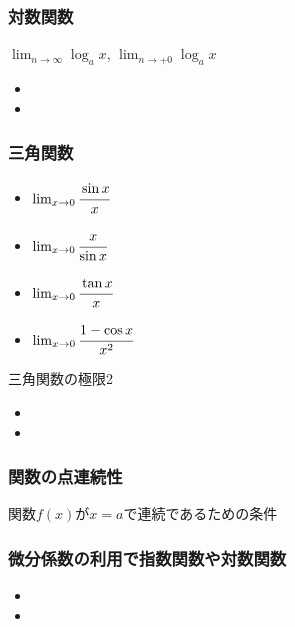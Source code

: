 \documentclass[10pt,dvipdfmx]{jsarticle}
\begin{document}
\subsubsection*{対数関数}
$\lim_{n\rightarrow\infty}\log_{a}x$, $\lim_{n\rightarrow+0}\log_{a}x$
\begin{Large}
  \begin{itemize}
    \item \item
  \end{itemize}
\end{Large}

\subsubsection*{三角関数}
\begin{Large}
  \begin{itemize}
    \item $\lim_{x\rightarrow0}\cfrac{\sin x}{x}$
    \item $\lim_{x\rightarrow0}\cfrac{x}{\sin x}$
    \item $\lim_{x\rightarrow0}\cfrac{\tan x}{x}$
    \item $\lim_{x\rightarrow0}\cfrac{1-\cos x}{x^2}$
  \end{itemize}
\end{Large}

\begin{itembox}[l]{三角関数の極限2}
  \begin{Large}
    \begin{itemize}
      \item \item
    \end{itemize}
  \end{Large}
\end{itembox}

\subsubsection*{関数の点連続性}
関数$f(x)$が$x=a$で連続であるための条件
\vspace{15mm}

\subsubsection*{微分係数の利用で指数関数や対数関数}
\begin{Large}
  \begin{itemize}
    \item \item
  \end{itemize}
\end{Large}
\end{document}
